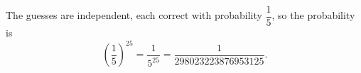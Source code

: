 The guesses are independent, each correct with probability $\dfrac15$, so the probability is
\[\left(\dfrac15\right)^{25}=\boxed{\dfrac{1}{5^{25}}}=\dfrac{1}{298023223876953125}.\]
